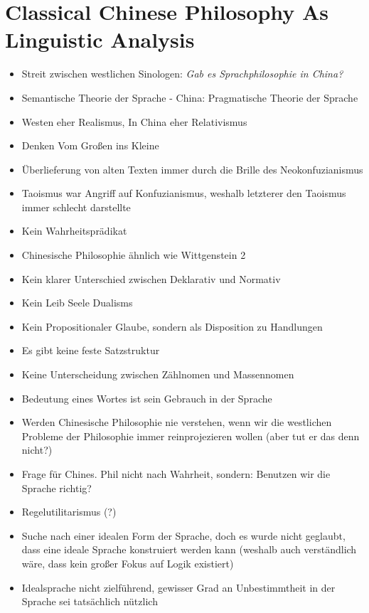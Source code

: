 \documentclass[a4paper, emulatestandardclasses]{scrartcl}
\begin{document}
\section*{Classical Chinese Philosophy As Linguistic Analysis}

\begin{itemize}
  \item Streit zwischen westlichen Sinologen: \emph{Gab es Sprachphilosophie in China?}
  \item Semantische Theorie der Sprache - China: Pragmatische Theorie der Sprache
  \item Westen eher Realismus, In China eher Relativismus
  \item Denken Vom Großen ins Kleine
  \item Überlieferung von alten Texten immer durch die Brille des Neokonfuzianismus
  \item Taoismus war Angriff auf Konfuzianismus, weshalb letzterer den Taoismus immer schlecht darstellte
  \item Kein Wahrheitsprädikat
  \item Chinesische Philosophie ähnlich wie Wittgenstein 2
  \item Kein klarer Unterschied zwischen Deklarativ und Normativ
  \item Kein Leib Seele Dualisms
  \item Kein Propositionaler Glaube, sondern als Disposition zu Handlungen
  \item Es gibt keine feste Satzstruktur
  \item Keine Unterscheidung zwischen Zählnomen und Massennomen
  \item Bedeutung eines Wortes ist sein Gebrauch in der Sprache
  \item Werden Chinesische Philosophie nie verstehen, wenn wir die westlichen Probleme der Philosophie immer reinprojezieren wollen (aber tut er das denn nicht?)
  \item Frage für Chines. Phil nicht nach Wahrheit, sondern: Benutzen wir die Sprache richtig?
  \item Regelutilitarismus (?)
  \item Suche nach einer idealen Form der Sprache, doch es wurde nicht geglaubt, dass eine ideale Sprache konstruiert werden kann (weshalb auch verständlich wäre, dass kein großer Fokus auf Logik existiert)
  \item Idealsprache nicht zielführend, gewisser Grad an Unbestimmtheit in der Sprache sei tatsächlich nützlich
\end{itemize}
\end{document}
